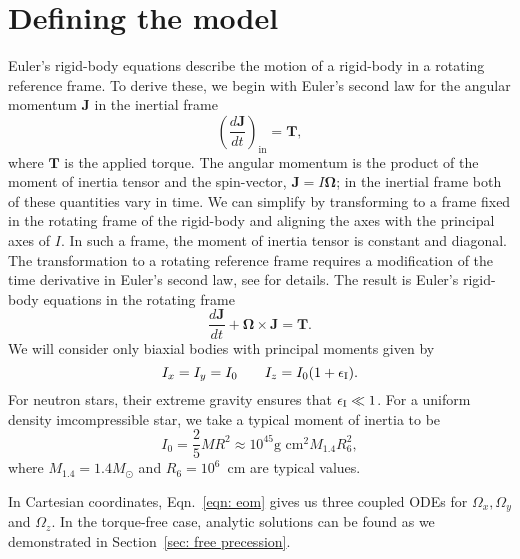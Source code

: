 \documentclass[../full_thesis/full_thesis.tex]{subfiles}
\begin{document}
\section{Defining the model}
\label{sec: defining the model}

Euler's rigid-body equations describe the motion of a rigid-body in a rotating
reference frame. To derive these, we begin with Euler's second law for the
angular momentum $\mathbf{J}$ in the inertial frame
\begin{equation}
    \left(\frac{d\mathbf{J}}{dt}\right)_{\textrm{in}}=\mathbf{T},
\end{equation}
where $\mathbf{T}$ is the applied torque. The angular momentum is the product
of the moment of inertia tensor and the spin-vector, $\mathbf{J}=I \mathbf{\Omega}$; in the inertial
frame both of these quantities vary in time. We can simplify by
transforming to a frame fixed in the rotating frame of the rigid-body and
aligning the axes with the principal axes of $I$. In such a frame, the moment
of inertia tensor is constant and diagonal. The transformation to a rotating reference
frame requires a modification of the time derivative in Euler's second law, see
\citet{Landau1969} for details. The result is Euler's rigid-body equations in
the rotating frame
\begin{equation}
    \frac{d\mathbf{J}}{dt} + \mathbf{\Omega} \times \mathbf{J} = \mathbf{T}.
    \label{eqn: eom}
\end{equation}
We will consider only biaxial bodies with principal moments given by
\begin{equation}
I_{x} = I_{y} = I_{0} \;\;\;\;\;\;\; I_{z} = I_{0}(1+\epsilon_{\mathrm{I}}).
\end{equation}
For neutron stars, their extreme gravity ensures that $\epsilon_{\mathrm{I}} \ll 1$. For
a uniform density imcompressible star, we take a typical moment of inertia to be
\begin{equation}
I_{0} = \frac{2}{5}MR^{2} \approx 10^{45}\textrm{g cm}^{2} M_{1.4}R_6^{2},
\end{equation}
where $M_{1.4} = 1.4 M_{\odot}$ and $R_6=10^{6}$~cm are typical values.

In Cartesian coordinates, Eqn.~\ref{eqn: eom} gives us three coupled ODEs
for $\Omega_{x}, \Omega_{y}$ and $\Omega_{z}$. In the torque-free case, analytic
solutions can be found as we demonstrated in Section~\ref{sec: free precession}.
\end{document}
